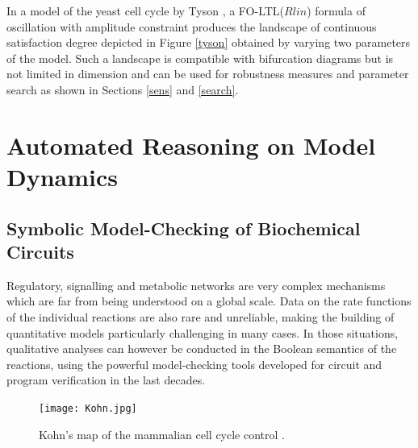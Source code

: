 \documentclass[graybox]{svmult}
\begin{document}
In a model of the yeast cell cycle by Tyson \cite{Tyson91pnas},
a FO-LTL($Rlin$) formula of oscillation with amplitude constraint
produces the landscape of continuous satisfaction degree depicted in Figure \ref{tyson}
obtained by varying two parameters of the model.
Such a landscape is compatible with bifurcation diagrams
but is not limited in dimension and can be used for robustness measures and parameter search as shown in Sections \ref{sens} and \ref{search}.

\section{Automated Reasoning on Model Dynamics}\label{dynamic}


\subsection{Symbolic Model-Checking of Biochemical Circuits}\label{MC}

Regulatory, signalling and metabolic networks are very complex mechanisms which are far from being understood on a global scale.
Data on the rate functions of the individual reactions are also rare and unreliable, 
making the building of quantitative models particularly challenging in many cases.
In those situations, qualitative analyses can however be conducted
in the Boolean semantics of the reactions,
using the powerful model-checking tools developed for circuit and program verification \cite{CGP99mit} in the last decades.


\begin{figure}[htb]
\begin{center}
\texttt{[image: Kohn.jpg]}
\end{center}
\caption{Kohn's map of the mammalian cell cycle control \cite{Kohn99mbc}.}\label{Kohn}
\end{figure}
\end{document}
